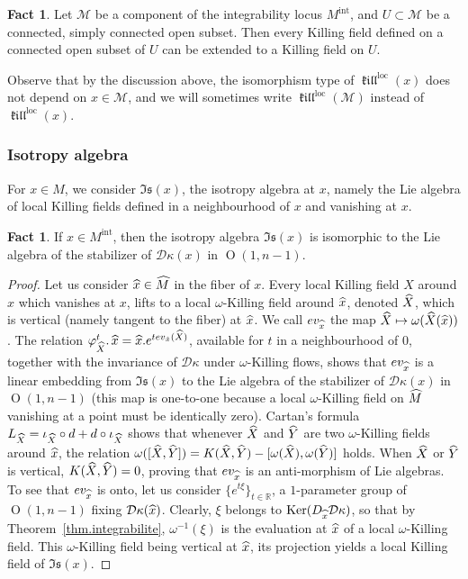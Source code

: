 \documentclass[11pt]{article}
\theoremstyle{definition}
\numberwithin{equation}{section}
\numberwithin{figure}{section}
\numberwithin{table}{section}
\newtheorem{fact}[theo]{Fact} }
\DeclareMathOperator{\Ker}{Ker}
\DeclareMathOperator{\Omp}{O}%
\DeclareMathOperator{\loc}{loc}
\newcommand{\mint}{{M^{\intl}}}
\DeclareMathOperator{\intl}{int}
\DeclareMathOperator{\kil}{{\mathfrak{kill}}}
\newcommand{\kiloc}{\kil^{\loc}}
\newcommand{\calm}{\mathcal{M}}
\newcommand*\dk{{\mathcal{D}\kappa}}
\newcommand*\RR{\mathbb{R}}
\newcommand{\hm}{{\hat{M}}}
\newcommand{\hx}{{\hat{x}}}
\let\oldhat\hat
\renewcommand*\hat[1]{\mathchoice{\widehat{#1}}{\widehat{#1}}{\widehat{#1}}{\oldhat{#1}}}
\begin{document}
\begin{fact}\label{fact.extensionbis}
Let $\calm$ be a component of the integrability locus $\mint$, and $U \subset \calm$ be a connected, simply connected open subset. Then every Killing field defined on a connected open subset of $U$ can be extended to a Killing field on $U$.
\end{fact}

Observe that by the discussion above, the isomorphism type of $\kiloc(x)$ does not depend on $x \in \calm$, and we will sometimes write $\kiloc({\mathcal M})$ instead of $\kiloc(x)$.


\subsubsection{Isotropy algebra}\label{sec.isotropy.algebra}
For $x \in M$, we consider $\mathfrak{Is}(x)$, the isotropy algebra at $x$, namely the Lie algebra of local Killing fields defined in a neighbourhood of $x$ and vanishing at $x$.

\begin{fact}\label{rk.isotropie}
If $x \in \mint$, then the isotropy algebra $\mathfrak{Is}(x)$ is isomorphic to the Lie algebra of the stabilizer of $\dk(x)$ in $\Omp(1,n-1)$.
\end{fact}


\begin{proof}
Let us consider $\hx \in \hm$ in the fiber of $x$. Every local Killing field $X$ around $x$ which vanishes at $x$, lifts to a local $\omega$-Killing field around $\hx$, denoted $\hat{X}$, which is vertical (namely tangent to the fiber) at $\hx$. We call $ev_{\hx}$ the map $\hat{X} \mapsto \omega(\hat{X}(\hx))$. The relation $\varphi_{\hat{X}}^t.\, \hx=\hx.e^{tev_{\hx}({\hat{X}})}$, available for $t$ in a neighbourhood of $0$, together with the invariance of $\dk$ under $\omega$-Killing flows, shows that $ev_{\hx}$ is a linear embedding from $\mathfrak{Is}(x)$ to the Lie algebra of the stabilizer of $\dk(x)$ in $\Omp(1,n-1)$ (this map is one-to-one because a local $\omega$-Killing field on $\hm$ vanishing at a point must be identically zero). Cartan's formula $L_{\hat{X}}=\iota_{\hat{X}} \circ d +d \circ \iota_{\hat{X}}$ shows that whenever $\hat{X}$ and $\hat{Y}$ are two $\omega$-Killing fields around $\hx$, the relation $\omega([\hat{X},\hat{Y}])=K(\hat{X},\hat{Y})-[\omega(\hat{X}),\omega(\hat{Y})]$ holds. When $\hat{X}$ or $\hat{Y}$ is vertical, $K(\hat{X},\hat{Y})=0$, proving that $ev_{\hx}$ is an anti-morphism of Lie algebras. To see that $ev_{\hx}$ is onto, let us consider $\{ e^{t \xi} \}_{t \in \RR}$, a $1$-parameter group of $\Omp(1,n-1)$ fixing $\dk(\hx)$. Clearly, $\xi$ belongs to $\Ker(D_{\hx}\dk)$, so that by Theorem~\ref{thm.integrabilite}, $\omega^{-1}(\xi)$ is the evaluation at $\hx$ of a local $\omega$-Killing field. This $\omega$-Killing field being vertical at $\hx$, its projection yields a local Killing field of ${\mathfrak{Is}}(x)$.
\end{proof}
\end{document}
